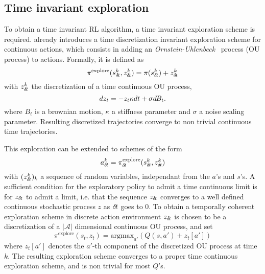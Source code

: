 \subsection{Time invariant exploration}
\label{subsec:explo}
To obtain a time invariant RL algorithm, a time invariant
exploration scheme is required. 
\cite{ddpg} already introduces a time discretization invariant exploration scheme for continuous actions, which consists in adding an
\emph{Ornstein-Uhlenbeck}~\cite{orn-uhl} process (OU process) to actions. Formally, it is defined as
\begin{equation}
	\pi^\text{explore}(s^k_{\delta\hspace{-.1em}t}, z^k_{\delta\hspace{-.1em}t}) = \pi(s^k_{\delta\hspace{-.1em}t}) + z^k_{\delta\hspace{-.1em}t}
\end{equation}
with $z^k_{\delta\hspace{-.1em}t}$ the discretization of a time continuous OU process, 
\begin{equation}
	dz_t = - z_t \kappa dt + \sigma d\hspace{-.1em}B_t.
	\label{eq:orn_uhl}
\end{equation}
where $B_t$ is a brownian motion, $\kappa$ a stiffness parameter and $\sigma$ a noise scaling parameter. Resulting discretized trajectories converge
to non trivial continuous time trajectories.

This exploration can be extended to schemes of the form
\begin{equation}
  \label{eq:explore}
	a^k_{\delta\hspace{-.1em}t} = \pi^\text{explore}_{\delta\hspace{-.1em}t}(s^k_{\delta\hspace{-.1em}t}, z^k_{\delta\hspace{-.1em}t})
\end{equation}
with $(z^k_{\delta\hspace{-.1em}t})_k$ a sequence of random variables, independant from the $a$'s and $s$'s.
A sufficient condition for the exploratory policy to admit a time continuous
limit is for
$z_{\delta\hspace{-.1em}t}$ to admit a limit, i.e. that the sequence $z_{\delta\hspace{-.1em}t}$ converges to a
well defined continuous stochastic process $z$ as ${\delta\hspace{-.1em}t}$ goes to $0$.
To obtain a temporally coherent exploration scheme in discrete action environment
$z_{\delta\hspace{-.1em}t}$ is chosen to be a discretization of a $|\mathcal{A}|$ dimensional
continuous OU process, and set
\begin{equation}
  \pi^\text{explore}(s_t, z_t)= \text{argmax}_{a'} \left(Q(s, a') + z_t[a']\right)
\end{equation}
where $z_t[a']$ denotes the $a'$-th component of the discretized OU process at time
$k$. The resulting exploration scheme converges to a proper time continuous exploration scheme,
and is non trivial for most $Q$'s.

